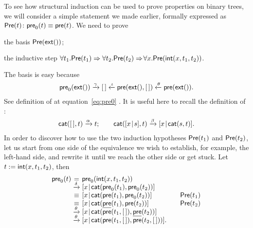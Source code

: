 To see how structural induction can be used to prove properties on
binary trees, we will consider a simple statement we made earlier,
formally expressed as \(\textsf{Pre}({t}) \colon \textsf{pre}_0(t) \equiv
\textsf{pre}(t)\).
We need to prove
\begin{itemize*}

  \item the basis \(\textsf{Pre}({\textsf{ext}()})\);

  \item the inductive step \(\forall t_1.\textsf{Pre}({t_1}) \Rightarrow
    \forall t_2.\textsf{Pre}({t_2}) \Rightarrow \! \forall
    x.\textsf{Pre}({\textsf{int}(x,t_1,t_2)})\).

\end{itemize*}
The basis is easy because
\begin{equation*}
  \textsf{pre}_0(\textsf{ext}())
  \xrightarrow{\smash{\gamma}} [\,] \xleftarrow{\smash{\iota}}
  \textsf{pre}(\textsf{ext}(),[\,]) \xleftarrow{\smash{\theta}}
  \textsf{pre}(\textsf{ext}()).
\end{equation*}
See definition of  at
equation~\eqref{eq:pre0} . It is useful here to
recall the definition of :
\begin{equation*}
\textsf{cat}([\,],t) \xrightarrow{\smash{\alpha}} t;
\qquad
\textsf{cat}([{x}\!\mid\!{s}],t) \xrightarrow{\smash{\beta}}
[{x}\!\mid\!{\textsf{cat}(s,t)}].
\end{equation*}
In order to discover how to use the two induction hypotheses
\(\textsf{Pre}({t_1})\) and \(\textsf{Pre}({t_2})\),
let us start from one side of the equivalence we wish to establish,
for example, the left\hyp{}hand side, and rewrite it until we reach
the other side or get stuck. Let \(t := \textsf{int}(x,t_1,t_2)\), then
\begin{equation*}
\begin{array}{@{}r@{\;}c@{\;}l@{\qquad}r@{}}
\fun{pre}_0(t)
& = & \fun{pre}_0(\fun{int}(x,t_1,t_2)) \\
& \xrightarrow{\smash{\delta}}
& \cons{x}{\fun{cat}(\fun{pre}_0(t_1), \fun{pre}_0(t_2))}\\
& \equiv & \cons{x}{\fun{cat}(\fun{pre}(t_1), \fun{pre}_0(t_2))}
& \IH{\pred{Pre}{t_1}}\\
& \equiv & \cons{x}{\fun{cat}(\ufun{pre}(t_1), \fun{pre}(t_2))}
& \IH{\pred{Pre}{t_2}}\\
& \xrightarrow{\smash{\theta}}
& \cons{x}{\fun{cat}(\fun{pre}(t_1,\el), \ufun{pre}(t_2))}\\
& \xrightarrow{\smash{\theta}}
& \cons{x}{\fun{cat}(\fun{pre}(t_1,\el), \fun{pre}(t_2,\el))}.
\end{array}
\end{equation*}
